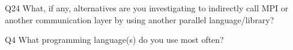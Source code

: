 \begin{description}%
\item{Q24} What, if any, alternatives are you investigating to indirectly call MPI or another communication layer by using another parallel language/library?%
\item{Q4} What programming language(s) do you use most often?%
\end{description}%

